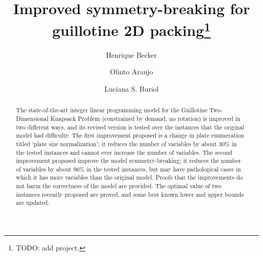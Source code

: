 \documentclass[runningheads]{llncs}
\begin{document}
\title{Improved symmetry-breaking for guillotine 2D packing\thanks{TODO: add project.}}


\author{Henrique Becker \and
Olinto Araujo \and
Luciana S. Buriol}



\maketitle

\begin{abstract}

The state-of-the-art integer linear programming model for the Guillotine Two-Dimensional Knapsack Problem (constrained by demand, no rotation) is improved in two different ways, and its revised version is tested over the instances that the original model had difficulty.
The first improvement proposed is a change in plate enumeration titled `plate size normalization'; it reduces the number of variables by about 30\% in the tested instances and cannot ever increase the number of variables. 
The second improvement proposed improve the model symmetry-breaking; it reduces the number of variables by about 96\% in the tested instances, but may have pathological cases in which it has more variables than the original model.
Proofs that the improvements do not harm the correctness of the model are provided.
The optimal value of two instances recently proposed are proved, and some best known lower and upper bounds are updated.

\end{abstract}
\end{document}
